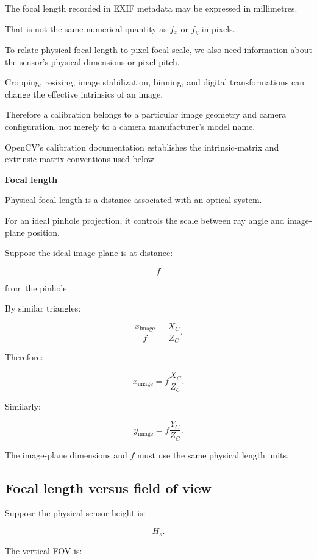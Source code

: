 The focal length recorded in EXIF metadata may be expressed in millimetres.

That is not the same numerical quantity as \(f_x\) or \(f_y\) in pixels.

To relate physical focal length to pixel focal scale, we also need information about the sensor's physical dimensions or pixel pitch.

Cropping, resizing, image stabilization, binning, and digital transformations can change the effective intrinsics of an image.

Therefore a calibration belongs to a particular image geometry and camera configuration, not merely to a camera manufacturer's model name.

OpenCV's calibration documentation establishes the intrinsic-matrix and extrinsic-matrix conventions used below. 

\textbf{Focal length}

Physical focal length is a distance associated with an optical system.

For an ideal pinhole projection, it controls the scale between ray angle and image-plane position.

Suppose the ideal image plane is at distance:

\[
 f
\]

from the pinhole.

By similar triangles:

\[
 \frac{x_{\mathrm{image}}}{f} = \frac{X_C}{Z_C}.
\]

Therefore:

\[
 \boxed{ x_{\mathrm{image}}= f\frac{X_C}{Z_C} }.
\]

Similarly:

\[
 \boxed{ y_{\mathrm{image}}= f\frac{Y_C}{Z_C} }.
\]

The image-plane dimensions and \(f\) must use the same physical length units.

\subsection{Focal length versus field of view}\label{02-foundations-ii-ch034-focal-length-versus-field-of-view}

\hypertarget{02-foundations-ii-ch034-focal-length-versus-field-of-view}{}

Suppose the physical sensor height is:

\[
 H_s.
\]

The vertical FOV is:


